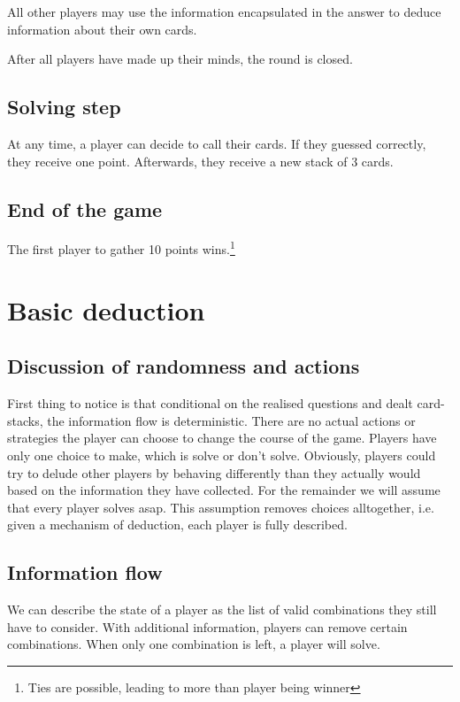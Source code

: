 \documentclass{article}
\begin{document}
All other players may use the information encapsulated in the answer to deduce information about their own cards.

After all players have made up their minds, the round is closed.

\subsection{Solving step}

At any time, a player can decide to call their cards. If they guessed correctly, they receive one point. Afterwards, they receive a new stack of 3 cards.

\subsection{End of the game}

The first player to gather 10 points wins.\footnote{Ties are possible, leading to more than player being winner}


\section{Basic deduction}

\subsection{Discussion of randomness and actions}

First thing to notice is that conditional on the realised questions and dealt card-stacks, the information flow is deterministic. 
There are no actual actions or strategies the player can choose to change the course of the game. 
Players have only one choice to make, which is solve or don't solve. 
Obviously, players could try to delude other players by behaving differently than they actually would based on the information they have collected. 
For the remainder we will assume that every player solves asap. 
This assumption removes choices alltogether, i.e. given a mechanism of deduction, each player is fully described.

\subsection{Information flow}

We can describe the state of a player as the list of valid combinations they still have to consider. With additional information, players can remove certain combinations. When only one combination is left, a player will solve.
\end{document}
